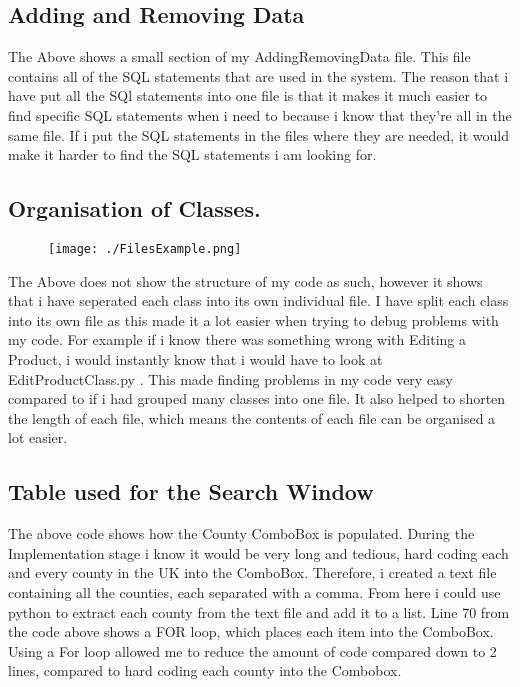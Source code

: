 \subsection{Adding and Removing Data}
\begin{figure}[H]
\end{figure}

The Above shows a small section of my AddingRemovingData file. This file contains all of the SQL statements that are used in the system. The reason that i have put all the SQl statements into one file is that it makes it much easier to find specific SQL statements when i need to because i know that they're all in the same file. If i put the SQL statements in the files where they are needed, it would make it harder to find the SQL statements i am looking for.

\subsection{Organisation of Classes.}
\begin{figure}[H]
    \texttt{[image: ./FilesExample.png]}
\end{figure}

The Above does not show the structure of my code as such, however it shows that i have seperated each class into its own individual file. I have split each class into its own file as this made it a lot easier when trying to debug problems with my code. For example if i know there was something wrong with Editing a Product, i would instantly know that i would have to look at EditProductClass.py . This made finding problems in my code very easy compared to if i had grouped many classes into one file. It also helped to shorten the length of each file, which means the contents of each file can be organised a lot easier.

\subsection{Table used for the Search Window}
\begin{figure}[H]
\end{figure}

The above code shows how the County ComboBox is populated. During the Implementation stage i know it would be very long and tedious, hard coding each and every county in the UK into the ComboBox. Therefore, i created a text file containing all the counties, each separated with a comma. From here i could use python to extract each county from the text file and add it to a list. Line 70 from the code above shows a FOR loop, which places each item into the ComboBox. Using a For loop allowed me to reduce the amount of code compared down to 2 lines, compared to hard coding each county into the Combobox. 

